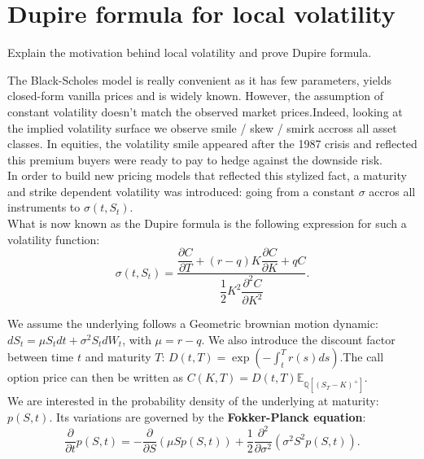 \section{Dupire formula for local volatility}

\begin{tcolorbox}[width=\linewidth, sharp corners=all, colback=white!95!black]
Explain the motivation behind local volatility and prove Dupire formula.
\end{tcolorbox}

The Black-Scholes model is really convenient as it has few parameters, yields closed-form vanilla prices and is widely known. However, the assumption of constant volatility doesn't match the observed market prices.\newline Indeed, looking at the implied volatility surface we observe smile / skew / smirk accross all asset classes. In equities, the volatility smile appeared after the 1987 crisis and reflected this premium buyers were ready to pay to hedge against the downside risk.\\
In order to build new pricing models that reflected this stylized fact, a maturity and strike dependent volatility was introduced: going from a constant $\sigma$ accros all instruments to $\sigma(t, S_t)$.\\

What is now known as the Dupire formula is the following expression for such a volatility function: $$\sigma(t, S_t) = \dfrac{\dfrac{\partial C}{\partial T} + (r-q)K \dfrac{\partial C}{\partial{K}} + qC}{\dfrac{1}{2}K^2 \dfrac{\partial^2{C}}{\partial{K^2}}}.$$

We assume the underlying follows a Geometric brownian motion dynamic: $dS_t = \mu S_t dt + \sigma^2 S_t dW_t$, with $\mu = r-q$. We also introduce the discount factor between time $t$ and maturity $T$: $D(t,T) = \exp \left( -\displaystyle \int_t^T r(s) ds \right)$.\newline The call option price can then be written as $C(K, T) = D(t, T)\mathbb{E}_{\mathbb{Q}\left[(S_T - K)^{+}\right]}$.\\

We are interested in the probability density of the underlying at maturity: $p(S, t)$. Its variations are governed by the \textbf{Fokker-Planck equation}: $$\dfrac{\partial}{\partial t}p(S,t) = -\dfrac{\partial}{\partial S}(\mu Sp(S,t)) + \dfrac{1}{2} \dfrac{\partial^2}{\partial \sigma^2}(\sigma^2 S^2 p(S,t)).$$\newline

